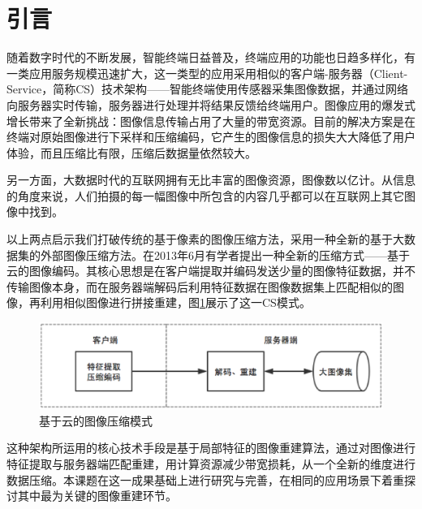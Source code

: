 \documentclass[UTF8]{csoarticle}
\begin{document}
\maketitle



\section{引言}

随着数字时代的不断发展，智能终端日益普及，终端应用的功能也日趋多样化，有一类应用服务规模迅速扩大，这一类型的应用采用相似的客户端-服务器（Client-Service，简称CS）技术架构——智能终端使用传感器采集图像数据，并通过网络向服务器实时传输，服务器进行处理并将结果反馈给终端用户。图像应用的爆发式增长带来了全新挑战：图像信息传输占用了大量的带宽资源。目前的解决方案是在终端对原始图像进行下采样和压缩编码，它产生的图像信息的损失大大降低了用户体验，而且压缩比有限，压缩后数据量依然较大。

另一方面，大数据时代的互联网拥有无比丰富的图像资源，图像数以亿计。从信息的角度来说，人们拍摄的每一幅图像中所包含的内容几乎都可以在互联网上其它图像中找到。

以上两点启示我们打破传统的基于像素的图像压缩方法，采用一种全新的基于大数据集的外部图像压缩方法。在2013年6月有学者提出一种全新的压缩方式——基于云的图像编码。其核心思想是在客户端提取并编码发送少量的图像特征数据，并不传输图像本身，而在服务器端解码后利用特征数据在图像数据集上匹配相似的图像，再利用相似图像进行拼接重建，图\ref{fig:overview}展示了这一CS模式。
\begin{figure}
\centering\includegraphics[width=12cm]{overview}
\caption{基于云的图像压缩模式}
\label{fig:overview}
\end{figure}
这种架构所运用的核心技术手段是基于局部特征的图像重建算法，通过对图像进行特征提取与服务器端匹配重建，用计算资源减少带宽损耗，从一个全新的维度进行数据压缩。本课题在这一成果基础上进行研究与完善，在相同的应用场景下着重探讨其中最为关键的图像重建环节。
\end{document}
